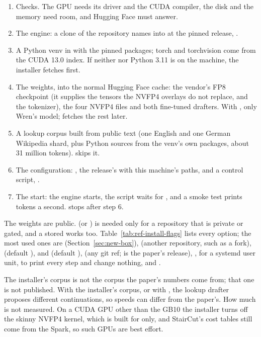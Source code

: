 \begin{enumerate}
\item Checks. The GPU needs its driver and the CUDA compiler, the disk and the memory need room, and Hugging Face must answer.
\item The engine: a clone of the repository  names into  at the pinned release, .
\item A Python venv in  with the pinned packages; torch and torchvision come from the CUDA 13.0 index. If neither  nor Python 3.11 is on the machine, the installer fetches  first.
\item The weights, into the normal Hugging Face cache: the vendor's FP8 checkpoint (it supplies the tensors the NVFP4 overlays do not replace, and the tokenizer), the four NVFP4 files and both fine-tuned drafters. With , only Wren's model;  fetches the rest later.
\item A lookup corpus built from public text (one English and one German Wikipedia shard, plus Python sources from the venv's own packages, about 31 million tokens).  skips it.
\item The configuration: , the release's  with this machine's paths, and a control script, .
\item The start: the engine starts, the script waits for , and a smoke test prints tokens a second.  stops after step 6.
\end{enumerate}

The weights are public.  (or ) is needed only for a repository that is private or gated, and a stored  works too. Table~\ref{tab:ref-install-flags} lists every option; the most used ones are  (Section~\ref{sec:new-box}),  (another repository, such as a fork),  (default ),  and  (default ),  (any git ref;  is the paper's release), ,  for a systemd user unit,  to print every step and change nothing, and .



The installer's corpus is not the corpus the paper's numbers come from; that one is not published. With the installer's corpus, or with , the lookup drafter proposes different continuations, so speeds can differ from the paper's. How much is not measured. On a CUDA GPU other than the GB10 the installer turns off the skinny NVFP4 kernel, which is built for  only, and StairCut's cost tables still come from the Spark, so such GPUs are best effort.

